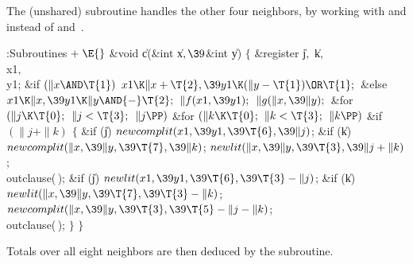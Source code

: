The (unshared)  subroutine handles the other four
neighbors,
by working with  and  instead of  and~.

\Y\B\4:Subroutines\X${}\mathrel+\E{}$\6
\&{void} \|c(\&{int} \|x${},\39{}$\&{int} \|y)\1\1\2\2\6
${}\{{}$\1\6
\&{register} \|j${},{}$ \|k${},{}$ \\{x1}${},{}$ \\{y1};\7
\&{if} ${}(\|x\AND\T{1}){}$\1\5
${}\\{x1}\K\|x+\T{2},\39\\{y1}\K(\|y-\T{1})\OR\T{1};{}$\2\6
\&{else}\1\5
${}\\{x1}\K\|x,\39\\{y1}\K\|y\AND{-}\T{2};{}$\2\6
${}\|f(\\{x1},\39\\{y1});{}$\6
${}\|g(\|x,\39\|y);{}$\6
\&{for} ${}(\|j\K\T{0};{}$ ${}\|j<\T{3};{}$ ${}\|j\PP){}$\1\6
\&{for} ${}(\|k\K\T{0};{}$ ${}\|k<\T{3};{}$ ${}\|k\PP){}$\1\6
\&{if} ${}(\|j+\|k){}$\5
${}\{{}$\1\6
\&{if} (\|j)\1\5
${}\\{newcomplit}(\\{x1},\39\\{y1},\39\T{6},\39\|j){}$;\2\6
\&{if} (\|k)\1\5
${}\\{newcomplit}(\|x,\39\|y,\39\T{7},\39\|k){}$;\2\6
${}\\{newlit}(\|x,\39\|y,\39\T{3},\39\|j+\|k){}$;\6
\\{outclause}(\,);\6
\&{if} (\|j)\1\5
${}\\{newlit}(\\{x1},\39\\{y1},\39\T{6},\39\T{3}-\|j){}$;\2%
\6
\&{if} (\|k)\1\5
${}\\{newlit}(\|x,\39\|y,\39\T{7},\39\T{3}-\|k){}$;\2\6
${}\\{newcomplit}(\|x,\39\|y,\39\T{3},\39\T{5}-\|j-\|k){}$;\6
\\{outclause}(\,);\6
\4${}\}{}$\2\2\2\6
\4${}\}{}$\2\par
\fi

Totals over all eight neighbors are then deduced by the %
subroutine.

